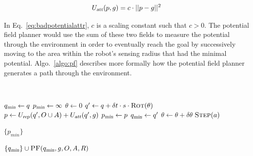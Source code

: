 \begin{equation}
    U_{\Var{att}}(p, g) = c \cdot ||p - g||^2
    \label{eq:badpotentialattr}
\end{equation}

In Eq.~\ref{eq:badpotentialattr}, $c$ is a scaling constant such that $c > 0$.
The potential field planner would use the sum of these two fields to measure
the potential through the environment in order to eventually reach the goal by
successively moving to the area within the robot's sensing radius that had the
minimal potential.  Algo.~\ref{algo:pf} describes more formally how the
potential field planner generates a path through the environment.

\begin{algorithm}[ht]

    \caption{$\Function{PF}(q, g, O, A, R)$}
    \\

    \label{algo:pf}
    \begin{algorithmic}[1]
        \setcounter{ALC@line}{0}
        \vspace*{1mm}

        \STATE $q_{\Var{min}} \leftarrow q$
        \STATE $p_{\Var{min}} \leftarrow \infty$
        \STATE $\theta \leftarrow 0$
        \WHILE {$\theta \leq 2\pi$}
            \STATE $q' \leftarrow q + \delta t \cdot s \cdot
            \Function{Rot}(\theta)$
            \STATE $p \leftarrow U_{\Var{rep}}(q', O \cup A)
            + U_{\Var{att}}(q', g)$
               \STATE $p_{\Var{min}} \leftarrow p$
                \STATE $q_{\Var{min}} \leftarrow q'$
            \ENDIF
            \STATE $\theta \leftarrow \theta + \delta \theta$
                \STATE $\Function{Step}(a)$
            \ENDFOR
        \ENDWHILE

            \RETURN $\{p_{min}\}$
        \ENDIF

        \RETURN $\{q_{\Var{min}}\} \cup \Function{PF}(q_{\Var{min}}, g, O, A, R)$
    \end{algorithmic}
\end{algorithm}

